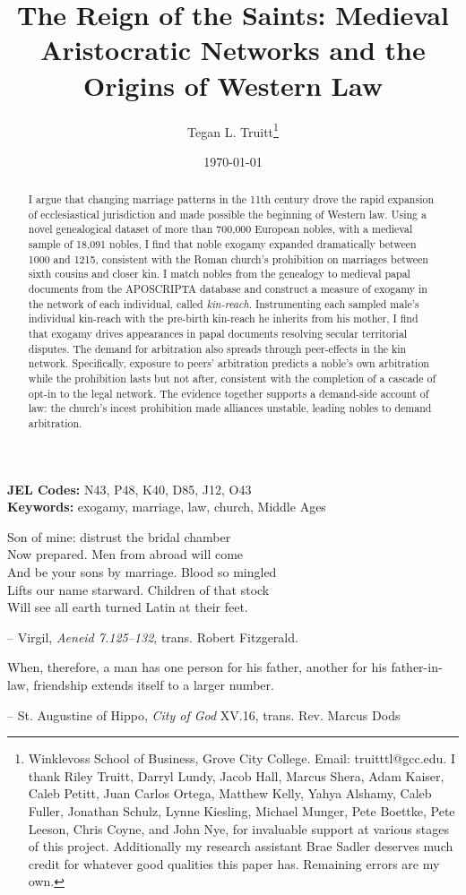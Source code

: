 \documentclass[12pt]{article}
\title{The Reign of the Saints: Medieval Aristocratic Networks and the Origins of Western Law}
\author{
    Tegan L. Truitt\thanks{Winklevoss School of Business, Grove City College. Email: truitttl@gcc.edu. I thank Riley Truitt, Darryl Lundy, Jacob Hall, Marcus Shera, Adam Kaiser, Caleb Petitt,  Juan Carlos Ortega, Matthew Kelly, Yahya Alshamy, Caleb Fuller, Jonathan Schulz, Lynne Kiesling, Michael Munger, Pete Boettke, Pete Leeson, Chris Coyne, and John Nye, for invaluable support at various stages of this project. Additionally my research assistant Brae Sadler deserves much credit for whatever good qualities this paper has. Remaining errors are my own.}}
\date{\today}
\theoremstyle{definition}
\theoremstyle{remark}
\begin{document}
\maketitle

\begin{abstract}
\noindent I argue that changing marriage patterns in the 11th century drove the rapid expansion of ecclesiastical jurisdiction and made possible the beginning of Western law. Using a novel genealogical dataset of more than 700,000 European nobles, with a medieval sample of 18,091 nobles, I find that noble exogamy expanded dramatically between 1000 and 1215, consistent with the Roman church's prohibition on marriages between sixth cousins and closer kin. I match nobles from the genealogy to medieval papal documents from the APOSCRIPTA database and construct a measure of exogamy in the network of each individual, called \textit{kin-reach}. Instrumenting each sampled male's individual kin-reach with the pre-birth kin-reach he inherits from his mother, I find that exogamy drives appearances in papal documents resolving secular territorial disputes. The demand for arbitration also spreads through peer-effects in the kin network. Specifically, exposure to peers' arbitration predicts a noble's own arbitration while the prohibition lasts but not after, consistent with the completion of a cascade of opt-in to the legal network. The evidence together supports a demand-side account of law: the church's incest prohibition made alliances unstable, leading nobles to demand arbitration.


\end{abstract}

\vspace{0.3in}

\noindent \textbf{JEL Codes:} N43, P48, K40, D85, J12, O43 \\
\textbf{Keywords:} exogamy, marriage, law, church, Middle Ages

\clearpage

\epigraph{Son of mine: distrust the bridal chamber
\\Now prepared. Men from abroad will come
\\And be your sons by marriage. Blood so mingled
\\Lifts our name starward. Children of that stock
\\Will see all earth turned Latin at their feet.}{-- Virgil, \textit{Aeneid 7.125--132}, trans. Robert Fitzgerald.}

\epigraph{When, therefore, a man has one person for his father, another for his father-in-law, friendship extends itself to a larger number.}{-- St. Augustine of Hippo, \textit{City of God} XV.16, trans. Rev. Marcus Dods}
\end{document}
